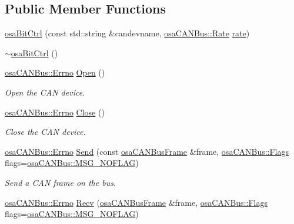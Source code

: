 \subsection*{Public Member Functions}
\begin{DoxyCompactItemize}
\item 
\hyperlink{classosa_bit_ctrl_a7e13429706eb1dc1fd497baae4a3fcd0}{osa\+Bit\+Ctrl} (const std\+::string \&candevname, \hyperlink{classosa_c_a_n_bus_ae977dbc0e1c16772395408c8e018fe6c}{osa\+C\+A\+N\+Bus\+::\+Rate} \hyperlink{classosa_c_a_n_bus_a4ff86a9ecf19161b1f34666888e0a331}{rate})
\item 
\hyperlink{classosa_bit_ctrl_aca3d2b1455d38e1b204d086a34b72596}{$\sim$osa\+Bit\+Ctrl} ()
\item 
\hyperlink{classosa_c_a_n_bus_a6fa3e95ec4c36932d0640e40e0748fde}{osa\+C\+A\+N\+Bus\+::\+Errno} \hyperlink{classosa_bit_ctrl_a15aee59c56dc544a743df2ec6c31616c}{Open} ()
\begin{DoxyCompactList}\small\item\em Open the C\+A\+N device. \end{DoxyCompactList}\item 
\hyperlink{classosa_c_a_n_bus_a6fa3e95ec4c36932d0640e40e0748fde}{osa\+C\+A\+N\+Bus\+::\+Errno} \hyperlink{classosa_bit_ctrl_ae9f22f9f65e034468625b4fb5f98c942}{Close} ()
\begin{DoxyCompactList}\small\item\em Close the C\+A\+N device. \end{DoxyCompactList}\item 
\hyperlink{classosa_c_a_n_bus_a6fa3e95ec4c36932d0640e40e0748fde}{osa\+C\+A\+N\+Bus\+::\+Errno} \hyperlink{classosa_bit_ctrl_a8bb8bcf5e56ce2e844dc9d5e5fa01b5c}{Send} (const \hyperlink{classosa_c_a_n_bus_frame}{osa\+C\+A\+N\+Bus\+Frame} \&frame, \hyperlink{classosa_c_a_n_bus_a74fe35c6059237887431f3ccece7b21b}{osa\+C\+A\+N\+Bus\+::\+Flags} flags=\hyperlink{classosa_c_a_n_bus_a74fe35c6059237887431f3ccece7b21ba30f701fa6e0dba6e274540941ccd3978}{osa\+C\+A\+N\+Bus\+::\+M\+S\+G\+\_\+\+N\+O\+F\+L\+A\+G})
\begin{DoxyCompactList}\small\item\em Send a C\+A\+N frame on the bus. \end{DoxyCompactList}\item 
\hyperlink{classosa_c_a_n_bus_a6fa3e95ec4c36932d0640e40e0748fde}{osa\+C\+A\+N\+Bus\+::\+Errno} \hyperlink{classosa_bit_ctrl_a1f333b8627d5bbe0b69afb78c432b801}{Recv} (\hyperlink{classosa_c_a_n_bus_frame}{osa\+C\+A\+N\+Bus\+Frame} \&frame, \hyperlink{classosa_c_a_n_bus_a74fe35c6059237887431f3ccece7b21b}{osa\+C\+A\+N\+Bus\+::\+Flags} flags=\hyperlink{classosa_c_a_n_bus_a74fe35c6059237887431f3ccece7b21ba30f701fa6e0dba6e274540941ccd3978}{osa\+C\+A\+N\+Bus\+::\+M\+S\+G\+\_\+\+N\+O\+F\+L\+A\+G})

\end{DoxyCompactItemize}
